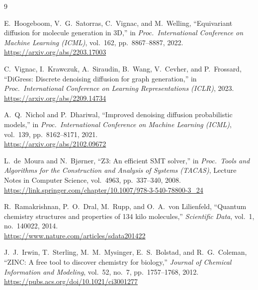 \documentclass[11pt]{article}
\begin{document}
\begin{thebibliography}{9}

E.~Hoogeboom, V.~G.~Satorras, C.~Vignac, and M.~Welling,
``Equivariant diffusion for molecule generation in 3D,''
in \textit{Proc.\ International Conference on Machine Learning (ICML)},
vol.~162, pp.~8867--8887, 2022.
\\\url{https://arxiv.org/abs/2203.17003}

C.~Vignac, I.~Krawczuk, A.~Siraudin, B.~Wang, V.~Cevher, and P.~Frossard,
``DiGress: Discrete denoising diffusion for graph generation,''
in \textit{Proc.\ International Conference on Learning Representations
(ICLR)}, 2023.
\\\url{https://arxiv.org/abs/2209.14734}

A.~Q.~Nichol and P.~Dhariwal,
``Improved denoising diffusion probabilistic models,''
in \textit{Proc.\ International Conference on Machine Learning (ICML)},
vol.~139, pp.~8162--8171, 2021.
\\\url{https://arxiv.org/abs/2102.09672}

L.~de~Moura and N.~Bj{\o}rner,
``Z3: An efficient SMT solver,''
in \textit{Proc.\ Tools and Algorithms for the Construction and Analysis
of Systems (TACAS)}, Lecture Notes in Computer Science, vol.~4963,
pp.~337--340, 2008.
\\\url{https://link.springer.com/chapter/10.1007/978-3-540-78800-3_24}

R.~Ramakrishnan, P.~O.~Dral, M.~Rupp, and O.~A.~von Lilienfeld,
``Quantum chemistry structures and properties of 134 kilo molecules,''
\textit{Scientific Data}, vol.~1, no.~140022, 2014.
\\\url{https://www.nature.com/articles/sdata201422}

J.~J.~Irwin, T.~Sterling, M.~M.~Mysinger, E.~S.~Bolstad, and R.~G.~Coleman,
``ZINC: A free tool to discover chemistry for biology,''
\textit{Journal of Chemical Information and Modeling}, vol.~52, no.~7,
pp.~1757--1768, 2012.
\\\url{https://pubs.acs.org/doi/10.1021/ci3001277}

\end{thebibliography}
\end{document}
